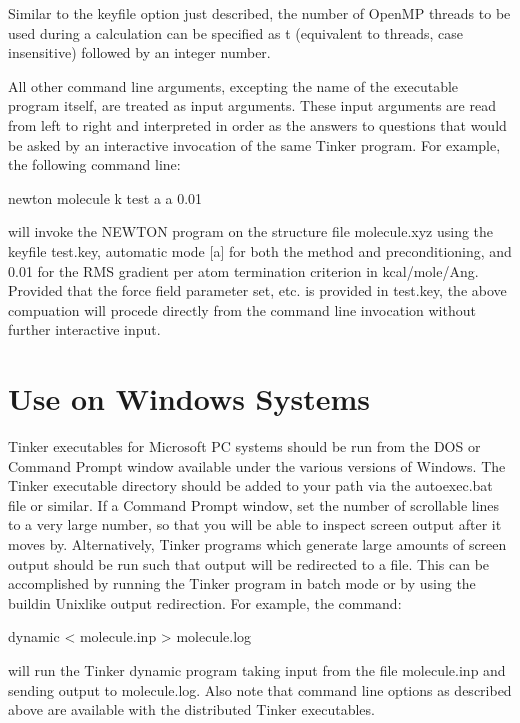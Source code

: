 \documentclass[letterpaper,11pt,english]{sphinxmanual}
\begin{document}
\sphinxAtStartPar
Similar to the keyfile option just described, the number of OpenMP threads to be used during a calculation can be specified as \sphinxhyphen{}t (equivalent to \sphinxhyphen{}threads, case insensitive) followed by an integer number.

\sphinxAtStartPar
All other command line arguments, excepting the name of the executable program itself, are treated as input arguments. These input arguments are read from left to right and interpreted in order as the answers to questions that would be asked by an interactive invocation of the same Tinker program. For example, the following command line:

\sphinxAtStartPar
newton molecule \sphinxhyphen{}k test a a 0.01

\sphinxAtStartPar
will invoke the NEWTON program on the structure file molecule.xyz using the keyfile test.key, automatic mode {[}a{]} for both the method and preconditioning, and 0.01 for the RMS gradient per atom termination criterion in kcal/mole/Ang. Provided that the force field parameter set, etc. is provided in test.key, the above compuation will procede directly from the command line invocation without further interactive input.


\section{Use on Windows Systems}
\label{\detokenize{text/special-features:use-on-windows-systems}}
\sphinxAtStartPar
Tinker executables for Microsoft PC systems should be run from the DOS or Command Prompt window available under the various versions of Windows. The Tinker executable directory should be added to your path via the autoexec.bat file or similar. If a Command Prompt window, set the number of scrollable lines to a very large number, so that you will be able to inspect screen output after it moves by. Alternatively, Tinker programs which generate large amounts of screen output should be run such that output will be redirected to a file. This can be accomplished by running the Tinker program in batch mode or by using the build\sphinxhyphen{}in Unix\sphinxhyphen{}like output redirection. For example, the command:

\sphinxAtStartPar
dynamic \textless{} molecule.inp \textgreater{} molecule.log

\sphinxAtStartPar
will run the Tinker dynamic program taking input from the file molecule.inp and sending output to molecule.log. Also note that command line options as described above are available with the distributed Tinker executables.
\end{document}
